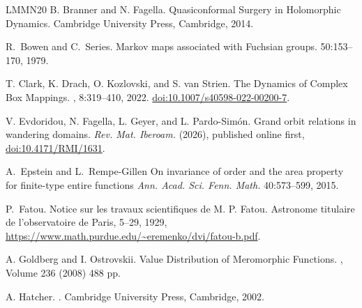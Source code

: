 \documentclass[11pt,a4paper, oneside]{amsart}
\theoremstyle{definition}
\theoremstyle{remark}
\numberwithin{equation}{section}
\begin{document}
\begin{thebibliography}{LMMN20}
B. Branner and N. Fagella.
\newblock Quasiconformal Surgery in Holomorphic Dynamics.
\newblock Cambridge University Press,
\newblock Cambridge, 2014.

R.~Bowen and C.~Series.
\newblock Markov maps associated with Fuchsian groups.
 50:153--170, 1979.

T. Clark, K. Drach, O. Kozlovski, and S. van Strien.
\newblock The Dynamics  of Complex Box Mappings.
, 8:319--410, 2022.   
\newblock \href{https://doi.org/10.1007/s40598-022-00200-7}{doi:10.1007/s40598-022-00200-7}.

V. Evdoridou, N. Fagella, L. Geyer, and L. Pardo-Sim\'on.
\newblock Grand orbit relations in wandering domains.
\newblock \emph{Rev. Mat. Iberoam.} (2026), published online first,
\newblock \href{https://doi.org/10.4171/RMI/1631}{doi:10.4171/RMI/1631}.


A.~Epstein and L.~Rempe-Gillen
\newblock On invariance of order and the area property for finite-type entire functions
\newblock \emph{Ann. Acad. Sci. Fenn. Math.} 40:573--599, 2015.

P.~Fatou.
\newblock Notice sur les travaux scientifiques de {M}. {P}. {F}atou.
\newblock Astronome titulaire de l'observatoire de Paris, 5--29, 1929,
\url{https://www.math.purdue.edu/~eremenko/dvi/fatou-b.pdf}.



A. Goldberg and I. Ostrovskii.
\newblock Value Distribution of Meromorphic Functions.
,
Volume 236 (2008) 488 pp.

A. Hatcher.
.
\newblock Cambridge University Press, Cambridge, 2002.


\end{thebibliography}
\end{document}
